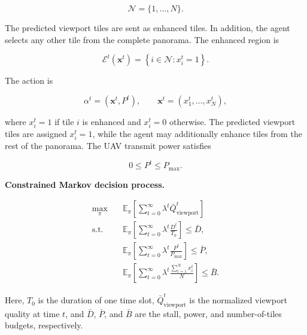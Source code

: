 \documentclass[10pt,conference,a4paper]{IEEEtran}
\newcommand{\E}{\mathbb{E}}
\newcommand{\head}[1]{%
    \vspace{2pt}
    \noindent
    \textbf{#1}
    \hspace{2pt}
}
\begin{document}
\begin{equation}
\mathcal{N}
=
\{1,\ldots,N\}.
\end{equation}

The predicted viewport tiles are sent as enhanced tiles. In
addition, the agent selects any other tile from the complete
panorama. The enhanced region is

\begin{equation}
\mathcal{E}^t(\mathbf{x}^t)
=
\left\{
i\in\mathcal{N}:x_i^t=1
\right\}.
\end{equation}

The action is

\begin{equation}
\alpha^t
=
(\mathbf{x}^t,P^t),
\qquad
\mathbf{x}^t
=
(x_1^t,\ldots,x_N^t),
\end{equation}

where $x_i^t=1$ if tile $i$ is enhanced and $x_i^t=0$
otherwise. The predicted viewport tiles are assigned
$x_i^t=1$, while the agent may additionally enhance tiles from
the rest of the panorama. The UAV transmit power satisfies

\begin{equation}
0\leq P^t\leq P_{\max}.
\end{equation}


\newpage


\head{Constrained Markov decision process.}


\begin{align}
\max_{\pi}\quad
&
\E_{\pi}
\left[
\sum_{t=0}^{\infty}
\lambda^t
\bar Q_{\mathrm{viewport}}^t
\right]
\\[-1pt]
\text{s.t.}\quad
&
\E_{\pi}
\left[
\sum_{t=0}^{\infty}
\lambda^t
\frac{D^t}{T_0}
\right]
\leq
\bar D,
\\[-1pt]
&
\E_{\pi}
\left[
\sum_{t=0}^{\infty}
\lambda^t
\frac{P^t}{P_{\max}}
\right]
\leq
\bar P,
\\[-1pt]
&
\E_{\pi}
\left[
\sum_{t=0}^{\infty}
\lambda^t
\frac{
\sum_{i=1}^{N}x_i^t
}{
N
}
\right]
\leq
\bar B.
\end{align}

Here, $T_0$ is the duration of one time slot,
$\bar Q_{\mathrm{viewport}}^t$ is the normalized viewport quality
at time $t$, and $\bar D$, $\bar P$, and $\bar B$ are the stall,
power, and number-of-tiles budgets, respectively.
\end{document}
